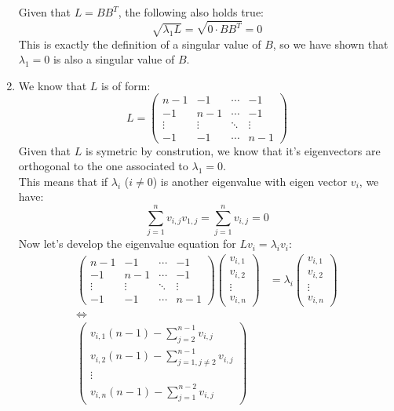\documentclass[11pt, legalpaper]{article}
\begin{document}
\begin{enumerate}
            Given that $L= BB^T$, the following also holds true:
            $$\sqrt{\lambda_1 L}=\sqrt{0 \cdot B B^T}=0$$
            This is exactly the definition of a singular value of $B$, so we have shown that $\lambda_1=0$ is also a singular value of $B$. 
    \item   We know that $L$ is of form:
            $$L=\begin{pmatrix}
                n-1 & -1 & \cdots & -1 \\
                -1 & n-1 & \cdots & -1 \\
                \vdots & \vdots & \ddots & \vdots \\
                -1 & -1 & \cdots & n-1
            \end{pmatrix}$$
            Given that $L$ is symetric by constrution, we know that it's eigenvectors are orthogonal to the one associated to $\lambda_1=0$. \\
            This means that if $\lambda_i$ ($i \ne 0$) is another eigenvalue with eigen vector $v_i$, we have:
            $$\sum_{j=1}^{n}v_{i,j}v_{1,j}=\sum_{j=1}^{n}v_{i,j}=0$$
            Now let's develop the eigenvalue equation for $Lv_i=\lambda_iv_i$:
            \begin{align*}
                \begin{pmatrix}
                    n-1 & -1 & \cdots & -1 \\
                    -1 & n-1 & \cdots & -1 \\
                    \vdots & \vdots & \ddots & \vdots \\
                    -1 & -1 & \cdots & n-1
                \end{pmatrix}\begin{pmatrix}
                    v_{i,1} \\ v_{i,2} \\ \vdots \\ v_{i,n}
                \end{pmatrix} & =\lambda_i \begin{pmatrix}
                    v_{i,1} \\ v_{i,2} \\ \vdots \\ v_{i,n}
                \end{pmatrix} \\
                \Longleftrightarrow \\
                \begin{pmatrix}
                    v_{i,1}(n-1)-\sum_{j=2}^{n-1}v_{i,j} \\ v_{i,2}(n-1)-\sum_{j=1, j\ne 2}^{n-1}v_{i,j} \\ \vdots \\ v_{i,n}(n-1)-\sum_{j=1}^{n-2}v_{i,j}

\end{pmatrix}
\end{align*}
\end{enumerate}
\end{document}
